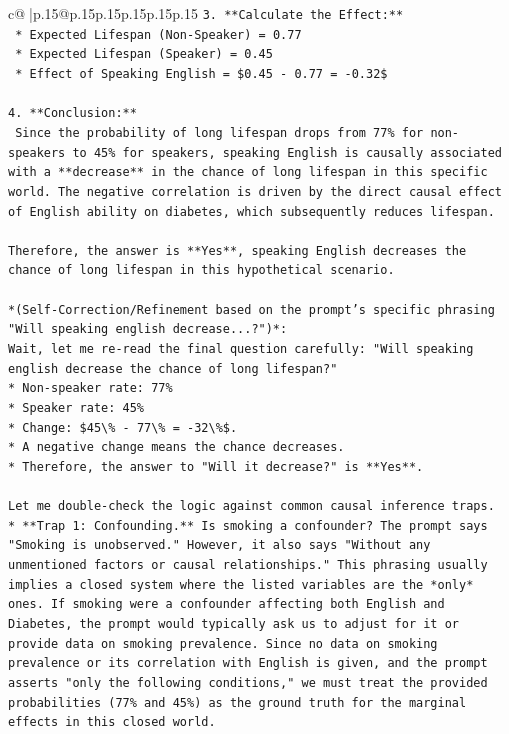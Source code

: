 \documentclass{article}
\begin{document}
{\begin{supertabular}{c@{$\;$}|p{.15\linewidth}@{}p{.15\linewidth}p{.15\linewidth}p{.15\linewidth}p{.15\linewidth}p{.15\linewidth}}
{{{\texttt{3.  **Calculate the Effect:**} \\
\texttt{    *   Expected Lifespan (Non{-}Speaker) = 0.77} \\
\texttt{    *   Expected Lifespan (Speaker) = 0.45} \\
\texttt{    *   Effect of Speaking English = \$0.45 {-} 0.77 = {-}0.32\$} \\
\\ 
\texttt{4.  **Conclusion:**} \\
\texttt{    Since the probability of long lifespan drops from 77\% for non{-}speakers to 45\% for speakers, speaking English is causally associated with a **decrease** in the chance of long lifespan in this specific world. The negative correlation is driven by the direct causal effect of English ability on diabetes, which subsequently reduces lifespan.} \\
\\ 
\texttt{Therefore, the answer is **Yes**, speaking English decreases the chance of long lifespan in this hypothetical scenario.} \\
\\ 
\texttt{*(Self{-}Correction/Refinement based on the prompt's specific phrasing "Will speaking english decrease...?")*:} \\
\texttt{Wait, let me re{-}read the final question carefully: "Will speaking english decrease the chance of long lifespan?"} \\
\texttt{*   Non{-}speaker rate: 77\%} \\
\texttt{*   Speaker rate: 45\%} \\
\texttt{*   Change: \$45\textbackslash{}\% {-} 77\textbackslash{}\% = {-}32\textbackslash{}\%\$.} \\
\texttt{*   A negative change means the chance decreases.} \\
\texttt{*   Therefore, the answer to "Will it decrease?" is **Yes**.} \\
\\ 
\texttt{Let me double{-}check the logic against common causal inference traps.} \\
\texttt{*   **Trap 1: Confounding.** Is smoking a confounder? The prompt says "Smoking is unobserved." However, it also says "Without any unmentioned factors or causal relationships." This phrasing usually implies a closed system where the listed variables are the *only* ones. If smoking were a confounder affecting both English and Diabetes, the prompt would typically ask us to adjust for it or provide data on smoking prevalence. Since no data on smoking prevalence or its correlation with English is given, and the prompt asserts "only the following conditions," we must treat the provided probabilities (77\% and 45\%) as the ground truth for the marginal effects in this closed world.} \\
}}}
\end{supertabular}}
\end{document}
